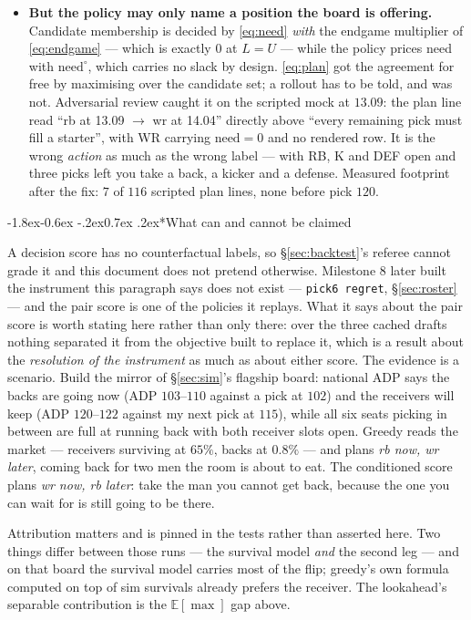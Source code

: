 \documentclass[10pt,a4paper]{article}
\makeatletter
\theoremstyle{plain}
\theoremstyle{definition}
\theoremstyle{remark}
\newcommand{\code}[1]{\texttt{\small #1}}
\renewcommand\subsubsection{\@startsection{subsubsection}{3}{\z@}%
  {-1.8ex\@plus -0.6ex \@minus -.2ex}{0.7ex \@plus .2ex}{\normalfont\normalsize\bfseries}}
\makeatother
\begin{document}
\begin{itemize}
\item \textbf{But the policy may only name a position the board is offering.} Candidate
membership is decided by \eqref{eq:need} \emph{with} the endgame multiplier of
\eqref{eq:endgame} --- which is exactly $0$ at $L = U$ --- while the policy prices need
with $\mathrm{need}^{\circ}$, which carries no slack by design. \eqref{eq:plan} got the
agreement for free by maximising over the candidate set; a rollout has to be told, and
was not. Adversarial review caught it on the scripted mock at $13.09$: the plan line read
``rb at 13.09 $\to$ wr at 14.04'' directly above ``every remaining pick must fill a
starter'', with WR carrying $\mathrm{need} = 0$ and no rendered row. It is the wrong
\emph{action} as much as the wrong label --- with RB, K and DEF open and three picks left
you take a back, a kicker and a defense. Measured footprint after the fix: $7$ of $116$
scripted plan lines, none before pick $120$.
\end{itemize}

\subsubsection*{What can and cannot be claimed}

A decision score has no counterfactual labels, so \S\ref{sec:backtest}'s referee cannot
grade it and this document does not pretend otherwise. Milestone 8 later built the
instrument this paragraph says does not exist --- \code{pick6 regret}, \S\ref{sec:roster}
--- and the pair score is one of the policies it replays. What it says about the pair
score is worth stating here rather than only there: over the three cached drafts nothing
separated it from the objective built to replace it, which is a result about the
\emph{resolution of the instrument} as much as about either score. The evidence is a scenario. Build
the mirror of \S\ref{sec:sim}'s flagship board: national ADP says the backs are going now
(ADP $103$--$110$ against a pick at $102$) and the receivers will keep (ADP $120$--$122$
against my next pick at $115$), while all six seats picking in between are full at
running back with both receiver slots open. Greedy reads the market --- receivers
surviving at $65\%$, backs at $0.8\%$ --- and plans \emph{rb now, wr later}, coming back
for two men the room is about to eat. The conditioned score plans \emph{wr now, rb
later}: take the man you cannot get back, because the one you can wait for is still going
to be there.

Attribution matters and is pinned in the tests rather than asserted here. Two things
differ between those runs --- the survival model \emph{and} the second leg --- and on
that board the survival model carries most of the flip; greedy's own formula computed on
top of sim survivals already prefers the receiver. The lookahead's separable contribution
is the $\mathbb{E}[\max]$ gap above.
\end{document}
